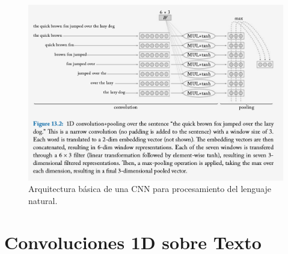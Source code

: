 \begin{figure}[h]
  \centering
  \includegraphics[scale=0.28]{pics/CNN.png}
  \caption{Arquitectura básica de una CNN para procesamiento del lenguaje natural.}
  \label{fig:cnn}
\end{figure}

\section{Convoluciones 1D sobre Texto}

